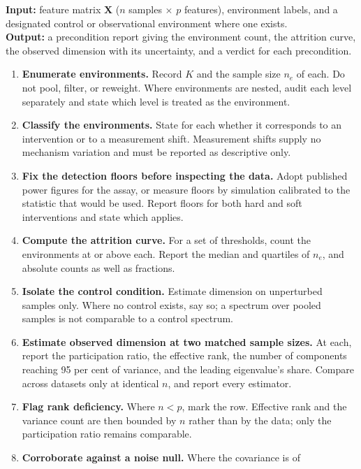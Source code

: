 \documentclass[journal,twoside,web]{ieeecolor}
\begin{document}
\begin{algorithm}[!t]
\caption{Precondition audit for a multi-environment dataset.}
\label{proc:audit}
\footnotesize
\textbf{Input:} feature matrix $\mathbf{X}$ ($n$ samples $\times$ $p$
features), environment labels, and a designated control or observational
environment where one exists.\\
\textbf{Output:} a precondition report giving the environment count, the
attrition curve, the observed dimension with its uncertainty, and a verdict
for each precondition.
\begin{enumerate}
\item \textbf{Enumerate environments.} Record $K$ and the sample size $n_e$ of
each. Do not pool, filter, or reweight. Where environments are nested, audit
each level separately and state which level is treated as the environment.
\item \textbf{Classify the environments.} State for each whether it
corresponds to an intervention or to a measurement shift. Measurement shifts
supply no mechanism variation and must be reported as descriptive only.
\item \textbf{Fix the detection floors before inspecting the data.} Adopt
published power figures for the assay, or measure floors by simulation
calibrated to the statistic that would be used. Report floors for both hard
and soft interventions and state which applies.
\item \textbf{Compute the attrition curve.} For a set of thresholds, count the
environments at or above each. Report the median and quartiles of $n_e$, and
absolute counts as well as fractions.
\item \textbf{Isolate the control condition.} Estimate dimension on
unperturbed samples only. Where no control exists, say so; a spectrum over
pooled samples is not comparable to a control spectrum.
\item \textbf{Estimate observed dimension at two matched sample sizes.} At
each, report the participation ratio, the effective rank, the number of
components reaching 95 per cent of variance, and the leading eigenvalue's
share. Compare across datasets only at identical $n$, and report every
estimator.
\item \textbf{Flag rank deficiency.} Where $n < p$, mark the row. Effective
rank and the variance count are then bounded by $n$ rather than by the data;
only the participation ratio remains comparable.
\item \textbf{Corroborate against a noise null.} Where the covariance is of

\end{enumerate}
\end{algorithm}
\end{document}
